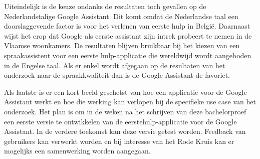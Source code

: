 Uiteindelijk is de keuze ondanks de resultaten toch gevallen op de Nederlandstalige Google Assistant. Dit komt omdat de Nederlandse taal een doorslaggevende factor is voor het verlenen van eerste hulp in België. Daarnaast wijst het erop dat Google als eerste assistant zijn intrek probeert te nemen in de Vlaamse woonkamers. De resultaten blijven bruikbaar bij het kiezen van een spraakassistent voor een eerste hulp-applicatie die wereldwijd wordt aangeboden in de Engelse taal. Als er enkel wordt afgegaan op de resultaten van het onderzoek naar de spraakkwaliteit dan is de Google Assistant de favoriet.

Als laatste is er een kort beeld geschetst van hoe een applicatie voor de Google Assistant werkt en hoe die werking kan verlopen bij de specifieke use case van het onderzoek. Het plan is om in de weken na het schrijven van deze bachelorproef een eerste versie te ontwikkelen van de eerstehulp-applicatie voor de Google Assistant. In de verdere toekomst kan deze versie getest worden. Feedback van gebruikers kan verwerkt worden en bij interesse van het Rode Kruis kan er mogelijks een samenwerking worden aangegaan.
